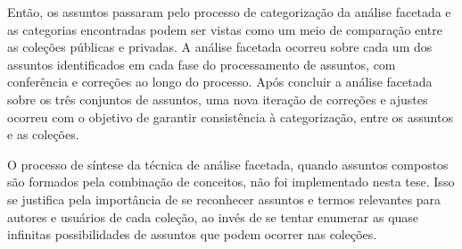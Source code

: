 Então, os assuntos passaram pelo processo de categorização da análise facetada e as categorias encontradas podem ser vistas como um meio de comparação entre as coleções públicas e privadas. A análise facetada ocorreu sobre cada um dos assuntos identificados em cada fase do processamento de assuntos, com conferência e correções ao longo do processo. Após concluir a análise facetada sobre os três conjuntos de assuntos, uma nova iteração de correções e ajustes ocorreu com o objetivo de garantir consistência à categorização, entre os assuntos e as coleções.

O processo de síntese da técnica de análise facetada, quando assuntos compostos são formados pela combinação de conceitos, não foi implementado nesta tese. Isso se justifica pela importância de se reconhecer assuntos e termos relevantes para autores e usuários de cada coleção, ao invés de se tentar enumerar as quase infinitas possibilidades de assuntos que podem ocorrer nas coleções.

